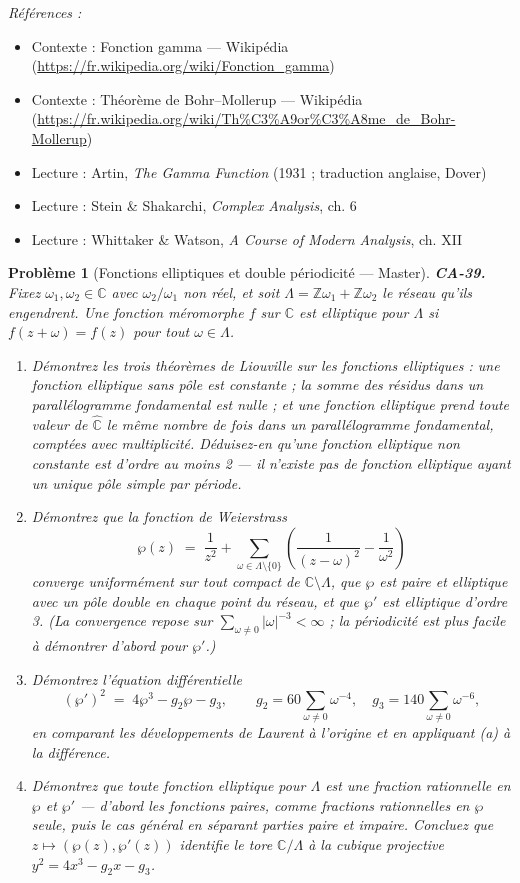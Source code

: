 \documentclass[11pt]{article}
\newtheorem{problem}{Problème}
\newenvironment{refs}{\par\small\noindent\emph{Références :}\begin{itemize}\setlength\itemsep{0pt}}{\end{itemize}\normalsize}
\begin{document}
\begin{refs}
\item Contexte : Fonction gamma --- Wikipédia (\url{https://fr.wikipedia.org/wiki/Fonction_gamma})
\item Contexte : Théorème de Bohr--Mollerup --- Wikipédia (\url{https://fr.wikipedia.org/wiki/Th%C3%A9or%C3%A8me_de_Bohr-Mollerup})
\item Lecture : Artin, \textit{The Gamma Function} (1931 ; traduction anglaise, Dover)
\item Lecture : Stein \& Shakarchi, \textit{Complex Analysis}, ch. 6
\item Lecture : Whittaker \& Watson, \textit{A Course of Modern Analysis}, ch. XII
\end{refs}

\bigskip

\begin{problem}[{Fonctions elliptiques et double périodicité --- Master}]
\textbf{CA-39.} Fixez $ \omega_1, \omega_2 \in \mathbb{C} $ avec $ \omega_2/\omega_1 $ non
réel, et soit $ \Lambda = \mathbb{Z}\omega_1 + \mathbb{Z}\omega_2 $ le réseau qu'ils engendrent.
Une fonction méromorphe $ f $ sur $ \mathbb{C} $ est \textit{elliptique} pour $ \Lambda $ si
$ f(z + \omega) = f(z) $ pour tout $ \omega \in \Lambda $.
\begin{enumerate}
\item[(a)] Démontrez les trois théorèmes de Liouville sur les fonctions elliptiques : une fonction
elliptique sans pôle est constante ; la somme des résidus dans un parallélogramme fondamental est
nulle ; et une fonction elliptique prend toute valeur de $ \hat{\mathbb{C}} $ le même nombre de
fois dans un parallélogramme fondamental, comptées avec multiplicité. Déduisez-en qu'une fonction
elliptique non constante est d'ordre au moins 2 --- il n'existe pas de fonction elliptique ayant un
unique pôle simple par période.
\item[(b)] Démontrez que la fonction de Weierstrass
\[ \wp(z) \;=\; \frac{1}{z^2} + \sum_{\omega \in \Lambda \setminus \{0\}}
\left( \frac{1}{(z - \omega)^2} - \frac{1}{\omega^2} \right) \]
converge uniformément sur tout compact de $ \mathbb{C} \setminus \Lambda $, que $ \wp $ est
paire et elliptique avec un pôle double en chaque point du réseau, et que $ \wp' $ est elliptique
d'ordre 3. (La convergence repose sur $ \sum_{\omega \ne 0} |\omega|^{-3} < \infty $ ; la
périodicité est plus facile à démontrer d'abord pour $ \wp' $.)
\item[(c)] Démontrez l'équation différentielle
\[ (\wp')^2 \;=\; 4\wp^3 - g_2 \wp - g_3, \qquad
g_2 = 60 \sum_{\omega \ne 0} \omega^{-4}, \quad g_3 = 140 \sum_{\omega \ne 0} \omega^{-6} , \]
en comparant les développements de Laurent à l'origine et en appliquant (a) à la différence.
\item[(d)] Démontrez que toute fonction elliptique pour $ \Lambda $ est une fraction rationnelle en
$ \wp $ et $ \wp' $ --- d'abord les fonctions paires, comme fractions rationnelles en $ \wp $
seule, puis le cas général en séparant parties paire et impaire. Concluez que
$ z \mapsto (\wp(z), \wp'(z)) $ identifie le tore $ \mathbb{C}/\Lambda $ à la cubique projective
$ y^2 = 4x^3 - g_2 x - g_3 $.
\end{enumerate}


\end{problem}
\end{document}
